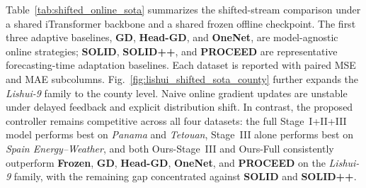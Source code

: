 ﻿\documentclass[journal]{IEEEtran}
\begin{document}
Table~\ref{tab:shifted_online_sota} summarizes the shifted-stream comparison under a shared iTransformer backbone and a shared frozen offline checkpoint. The first three adaptive baselines, \textbf{GD}, \textbf{Head-GD}, and \textbf{OneNet}, are model-agnostic online strategies; \textbf{SOLID}, \textbf{SOLID++}, and \textbf{PROCEED} are representative forecasting-time adaptation baselines. Each dataset is reported with paired MSE and MAE subcolumns. Fig.~\ref{fig:lishui_shifted_sota_county} further expands the \textit{Lishui-9} family to the county level. Naive online gradient updates are unstable under delayed feedback and explicit distribution shift. In contrast, the proposed controller remains competitive across all four datasets: the full Stage~I+II+III model performs best on \textit{Panama} and \textit{Tetouan}, Stage~III alone performs best on \textit{Spain Energy--Weather}, and both Ours-Stage~III and Ours-Full consistently outperform \textbf{Frozen}, \textbf{GD}, \textbf{Head-GD}, \textbf{OneNet}, and \textbf{PROCEED} on the \textit{Lishui-9} family, with the remaining gap concentrated against \textbf{SOLID} and \textbf{SOLID++}.
\end{document}
